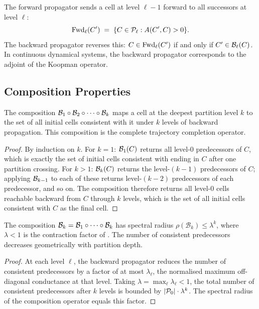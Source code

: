 \begin{remark}[Duality]
The forward propagator sends a cell at level $\ell-1$ forward to all
successors at level $\ell$:
\[
    \mathrm{Fwd}_\ell(C') \;=\; \{C \in \mathcal{P}_\ell : A(C', C) > 0\}.
\]
The backward propagator reverses this: $C \in \mathrm{Fwd}_\ell(C')$ if and only if
$C' \in \mathcal{B}_\ell(C)$.  In continuous dynamical systems, the backward
propagator corresponds to the adjoint of the Koopman operator.
\end{remark}

\subsection{Composition Properties}

\begin{proposition}
\label{prop:back-compose}
The composition $\mathcal{B}_1 \circ \mathcal{B}_2 \circ \cdots \circ \mathcal{B}_k$ maps a
cell at the deepest partition level $k$ to the set of all initial cells
consistent with it under $k$ levels of backward propagation.  This
composition is the complete trajectory completion operator.
\end{proposition}

\begin{proof}
By induction on $k$.  For $k=1$: $\mathcal{B}_1(C)$ returns all level-0 predecessors
of $C$, which is exactly the set of initial cells consistent with ending in $C$
after one partition crossing.  For $k > 1$: $\mathcal{B}_k(C)$ returns the level-$(k-1)$
predecessors of $C$; applying $\mathcal{B}_{k-1}$ to each of these returns
level-$(k-2)$ predecessors of each predecessor, and so on.  The composition
therefore returns all level-0 cells reachable backward from $C$ through $k$
levels, which is the set of all initial cells consistent with $C$ as the final
cell.
\end{proof}

\begin{theorem}
\label{thm:back-spectral}
The composition $\mathcal{B}_k = \mathcal{B}_1 \circ \cdots \circ \mathcal{B}_k$ has
spectral radius $\rho(\mathcal{B}_k) \le \lambda^k$, where $\lambda < 1$ is
the contraction factor of .  The number of consistent
predecessors decreases geometrically with partition depth.
\end{theorem}

\begin{proof}
At each level $\ell$, the backward propagator reduces the number of consistent
predecessors by a factor of at most $\lambda_\ell$, the normalised maximum
off-diagonal conductance at that level.  Taking $\lambda = \max_\ell \lambda_\ell
< 1$, the total number of consistent predecessors after $k$ levels is bounded by
$|\mathcal{P}_0| \cdot \lambda^k$.  The spectral radius of the composition
operator equals this factor.
\end{proof}

